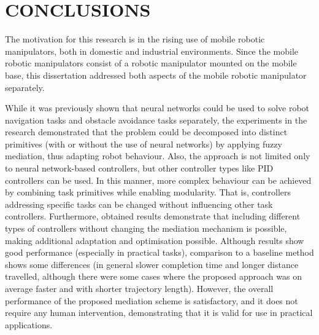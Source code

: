 \chapter{CONCLUSIONS}
\label{chap:Conclusions}

The motivation for this research is in the rising use of mobile robotic manipulators, both in domestic and industrial environments. Since the mobile robotic manipulators consist of a robotic manipulator mounted on the mobile base, this dissertation addressed both aspects of the mobile robotic manipulator separately. 


While it was previously shown that neural networks could be used to solve robot navigation tasks and obstacle avoidance tasks separately, the experiments in the research demonstrated that the problem could be decomposed into distinct primitives (with or without the use of neural networks) by applying fuzzy mediation, thus adapting robot behaviour. Also, the approach is not limited only to neural network-based controllers, but other controller types like PID controllers can be used. In this manner, more complex behaviour can be achieved by combining task primitives while enabling modularity. That is, controllers addressing specific tasks can be changed without influencing other task controllers. Furthermore, obtained results demonstrate that including different types of controllers without changing the mediation mechanism is possible, making additional adaptation and optimisation possible. Although results show good performance (especially in practical tasks), comparison to a baseline method shows some differences (in general slower completion time and longer distance travelled, although there were some cases where the proposed approach was on average faster and with shorter trajectory length). However, the overall performance of the proposed mediation scheme is satisfactory, and it does not require any human intervention, demonstrating that it is valid for use in practical applications.

